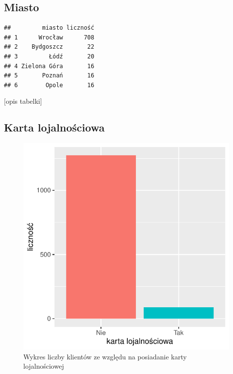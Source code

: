 \documentclass{article}\usepackage[]{graphicx}\usepackage[]{xcolor}
\makeatletter
\def\maxwidth{ %
  \ifdim\Gin@nat@width>\linewidth
    \linewidth
  \else
    \Gin@nat@width
  \fi
}
\newenvironment{kframe}{%
 \def\at@end@of@kframe{}%
 \ifinner\ifhmode%
  \def\at@end@of@kframe{\end{minipage}}%
  \begin{minipage}{\columnwidth}%
 \fi\fi%
 \def\FrameCommand##1{\hskip\@totalleftmargin \hskip-\fboxsep
 \colorbox{shadecolor}{##1}\hskip-\fboxsep
     \hskip-\linewidth \hskip-\@totalleftmargin \hskip\columnwidth}%
 \MakeFramed {\advance\hsize-\width
   \@totalleftmargin\z@ \linewidth\hsize
   \@setminipage}}%
 {\par\unskip\endMakeFramed%
 \at@end@of@kframe}
\newenvironment{knitrout}{}{} %
\makeatother
\begin{document}
\subsection{Miasto}
\begin{knitrout}
\color{fgcolor}\begin{kframe}
\begin{verbatim}
##         miasto liczność
## 1      Wrocław      708
## 2    Bydgoszcz       22
## 3         Łódź       20
## 4 Zielona Góra       16
## 5       Poznań       16
## 6        Opole       16
\end{verbatim}
\end{kframe}
\end{knitrout}

[opis tabelki]

\subsection{Karta lojalnościowa}
\begin{knitrout}
\color{fgcolor}\begin{figure}

{\centering \includegraphics[width=\maxwidth]{figure/fig_karta-1} 

}

\caption[Wykres liczby klientów ze względu na posiadanie karty lojalnościowej]{Wykres liczby klientów ze względu na posiadanie karty lojalnościowej}\label{fig:fig_karta}
\end{figure}

\end{knitrout}
\end{document}
